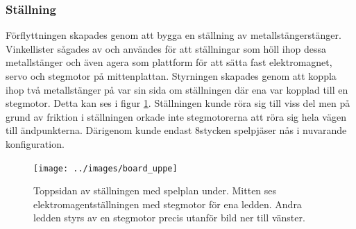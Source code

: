 \documentclass[a4paper]{article}
\begin{document}
\subsubsection*{Ställning}
Förflyttningen skapades genom att bygga en ställning av metallstängerstänger.
Vinkellister sågades av och användes för att ställningar som höll ihop dessa metallstänger och även agera som plattform för att sätta fast elektromagnet, servo och stegmotor på mittenplattan.
Styrningen skapades genom att koppla ihop två metallstänger på var sin sida om ställningen där ena var kopplad till en stegmotor.
Detta kan ses i figur \ref{board_uppe}.
Ställningen kunde röra sig till viss del men på grund av friktion i ställningen orkade inte stegmotorerna att röra sig hela vägen till ändpunkterna.
Därigenom kunde endast 8stycken spelpjäser nås i nuvarande konfiguration.
\begin{figure}\label{board_uppe}
\centering
\texttt{[image: ../images/board\_uppe]}
\caption{Toppsidan av ställningen med spelplan under. Mitten ses elektromagentställningen med stegmotor för ena ledden. Andra ledden styrs av en stegmotor precis utanför bild ner till vänster.}
\end{figure}
\end{document}
